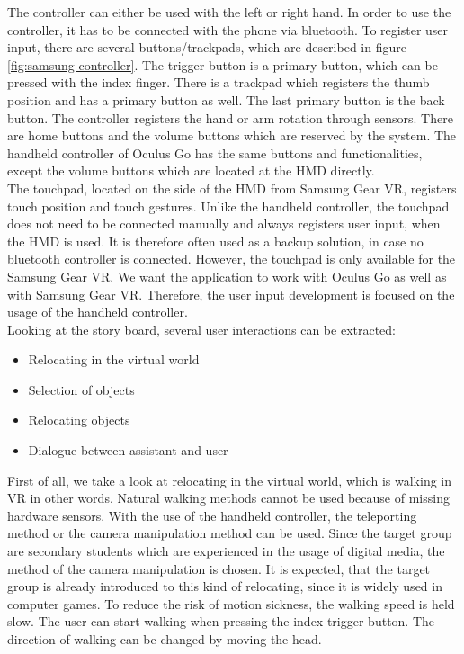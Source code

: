 The controller can either be used with the left or right hand. In order to use the controller, it has to be connected with the phone via bluetooth. To register user input, there are several buttons/trackpads, which are described in figure \ref{fig:samsung-controller}. The trigger button is a primary button, which can be pressed with the index finger. There is a trackpad which registers the thumb position and has a primary button as well. The last primary button is the back button. The controller registers the hand or arm rotation through sensors. There are home buttons and the volume buttons which are reserved by the system. The handheld controller of Oculus Go has the same buttons and functionalities, except the volume buttons which are located at the HMD directly.\\
The touchpad, located on the side of the HMD from Samsung Gear VR, registers touch position and touch gestures. Unlike the handheld controller, the touchpad does not need to be connected manually and always registers user input, when the HMD is used. It is therefore often used as a backup solution, in case no bluetooth controller is connected. However, the touchpad is only available for the Samsung Gear VR. We want the application to work with Oculus Go as well as with Samsung Gear VR. Therefore, the user input development is focused on the usage of the handheld controller.\\
Looking at the story board, several user interactions can be extracted:
\begin{itemize}
\item Relocating in the virtual world
\item Selection of objects
\item Relocating objects
\item Dialogue between assistant and user
\end{itemize}
First of all, we take a look at relocating in the virtual world, which is walking in VR in other words. Natural walking methods cannot be used because of missing hardware sensors. With the use of the handheld controller, the teleporting method or the camera manipulation method can be used. Since the target group are secondary students which are experienced in the usage of digital media, the method of the camera manipulation is chosen. It is expected, that the target group is already introduced to this kind of relocating, since it is widely used in computer games. To reduce the risk of motion sickness, the walking speed is held slow. The user can start walking when pressing the index trigger button. The direction of walking can be changed by moving the head.\\
